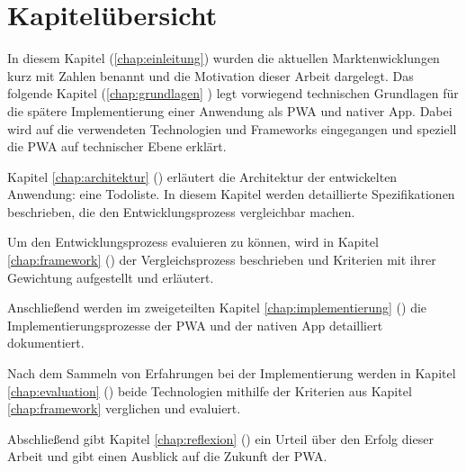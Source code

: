 \section{Kapitelübersicht}
In diesem Kapitel (\ref{chap:einleitung}) wurden die aktuellen Marktenwicklungen kurz mit Zahlen benannt und die Motivation dieser Arbeit dargelegt. Das folgende Kapitel (\ref{chap:grundlagen} ) legt vorwiegend technischen Grundlagen für die spätere Implementierung einer Anwendung als PWA und nativer App. Dabei wird auf die verwendeten Technologien und Frameworks eingegangen und speziell die PWA auf technischer Ebene erklärt. 

Kapitel \ref{chap:architektur} () erläutert die Architektur der entwickelten Anwendung: eine Todoliste. In diesem Kapitel werden detaillierte Spezifikationen beschrieben, die den Entwicklungsprozess vergleichbar machen. %

Um den Entwicklungsprozess evaluieren zu können, wird in Kapitel \ref{chap:framework} () der Vergleichsprozess beschrieben und Kriterien mit ihrer Gewichtung aufgestellt und erläutert. 

Anschließend werden im zweigeteilten Kapitel \ref{chap:implementierung} () die Implementierungsprozesse der PWA und der nativen App detailliert dokumentiert.

Nach dem Sammeln von Erfahrungen bei der Implementierung werden in Kapitel \ref{chap:evaluation} () beide Technologien mithilfe der Kriterien aus Kapitel \ref{chap:framework} verglichen und evaluiert.

Abschließend gibt Kapitel \ref{chap:reflexion} () ein Urteil über den Erfolg dieser Arbeit und gibt einen Ausblick auf die Zukunft der PWA.
